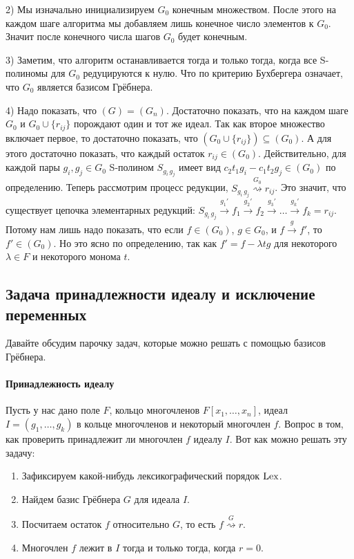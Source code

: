 2) Мы изначально инициализируем $G_0$ конечным множеством.
После этого на каждом шаге алгоритма мы добавляем лишь конечное число элементов к $G_0$.
Значит после конечного числа шагов $G_0$ будет конечным.

3) Заметим, что алгоритм останавливается тогда и только тогда, когда все S-полиномы для $G_0$ редуцируются к нулю.
Что по критерию Бухбергера означает, что $G_0$ является базисом Грёбнера.

4) Надо показать, что $(G) = (G_n)$.
Достаточно показать, что на каждом шаге $G_0$ и $G_0 \cup \{r_{ij}\}$ порождают один и тот же идеал.
Так как второе множество включает первое, то достаточно показать, что $(G_0 \cup \{r_{ij}\}) \subseteq (G_0)$.
А для этого достаточно показать, что каждый остаток $r_{ij}\in (G_0)$.
Действительно, для каждой пары $g_i,g_j\in G_0$ S-полином $S_{g_i\,g_j}$ имеет вид $c_2t_1 g_i - c_1 t_2 g_j\in (G_0)$ по определению.
Теперь рассмотрим процесс редукции, $S_{g_i\,g_j}\stackrel{G_0}{\rightsquigarrow}r_{ij}$.
Это значит, что существует цепочка элементарных редукций: $S_{g_i\,g_j}\stackrel{g_1'}{\longrightarrow}f_1\stackrel{g_2'}{\longrightarrow}f_2\stackrel{g_3'}{\longrightarrow}\ldots\stackrel{g_k'}{\longrightarrow}f_k = r_{ij}$.
Потому нам лишь надо показать, что если $f\in (G_0)$, $g\in G_0$, и $f\stackrel{g}{\longrightarrow}f'$, то $f'\in (G_0)$.
Но это ясно по определению, так как $f' = f - \lambda t g$ для некоторого $\lambda \in F$ и некоторого монома $t$.

\subsection{Задача принадлежности идеалу и исключение переменных}

Давайте обсудим парочку задач, которые можно решать с помощью базисов Грёбнера.

\paragraph{Принадлежность идеалу}

Пусть у нас дано поле $F$, кольцо многочленов $F[x_1,\ldots,x_n]$, идеал $I = (g_1,\ldots,g_k)$ в кольце многочленов и некоторый многочлен $f$.
Вопрос в том, как проверить принадлежит ли многочлен $f$ идеалу $I$.
Вот как можно решать эту задачу:
\begin{enumerate}
\item Зафиксируем какой-нибудь лексикографический порядок $\operatorname{Lex}$.

\item Найдем базис Грёбнера $G$ для идеала $I$.

\item Посчитаем остаток $f$ относительно $G$, то есть $f\stackrel{G}{\rightsquigarrow}r$.

\item Многочлен $f$ лежит в $I$ тогда и только тогда, когда $r = 0$.
\end{enumerate}

